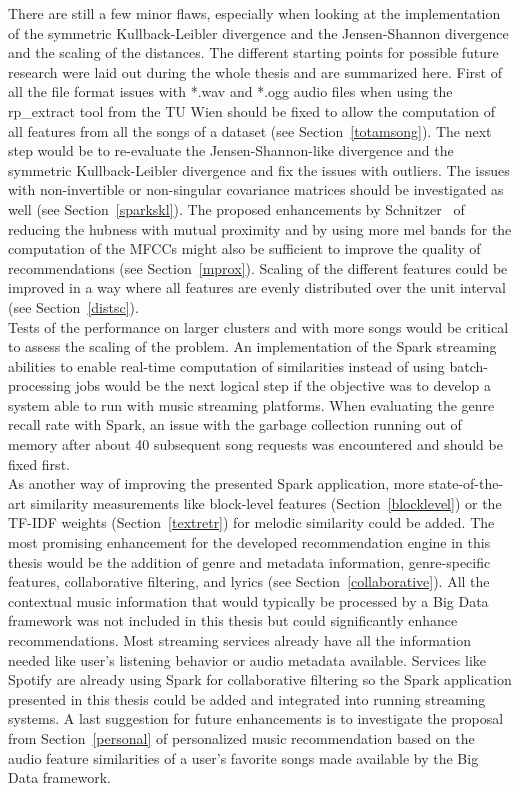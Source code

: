 There are still a few minor flaws, especially when looking at the implementation of the symmetric Kullback-Leibler divergence and the Jensen-Shannon divergence and the scaling of the distances. The different starting points for possible future research were laid out during the whole thesis and are summarized here. First of all the file format issues with *.wav and *.ogg audio files when using the rp\_extract tool from the TU Wien should be fixed to allow the computation of all features from all the songs of a dataset (see Section~\ref{totamsong}).
The next step would be to re-evaluate the Jensen-Shannon-like divergence and the symmetric Kullback-Leibler divergence and fix the issues with outliers. The issues with non-invertible or non-singular covariance matrices should be investigated as well (see Section~\ref{sparkskl}). The proposed enhancements by Schnitzer~\cite{schnitzer1} of reducing the hubness with mutual proximity and by using more mel bands for the computation of the MFCCs might also be sufficient to improve the quality of recommendations (see Section~\ref{mprox}). Scaling of the different features could be improved in a way where all features are evenly distributed over the unit interval (see Section~\ref{distsc}).\\
Tests of the performance on larger clusters and with more songs would be critical to assess the scaling of the problem.
An implementation of the Spark streaming abilities to enable real-time computation of similarities instead of using batch-processing jobs would be the next logical step if the objective was to develop a system able to run with music streaming platforms. When evaluating the genre recall rate with Spark, an issue with the garbage collection running out of memory after about 40 subsequent song requests was encountered and should be fixed first.\\
\noindent As another way of improving the presented Spark application, more state-of-the-art similarity measurements like block-level features (Section~\ref{blocklevel}) or the TF-IDF weights (Section~\ref{textretr}) for melodic similarity could be added. The most promising enhancement for the developed recommendation engine in this thesis would be the addition of genre and metadata information, genre-specific features, collaborative filtering, and lyrics (see Section~\ref{collaborative}). All the contextual music information that would typically be processed by a Big Data framework was not included in this thesis but could significantly enhance recommendations. Most streaming services already have all the information needed like user's listening behavior or audio metadata available. Services like Spotify are already using Spark for collaborative filtering so the Spark application presented in this thesis could be added and integrated into running streaming systems. A last suggestion for future enhancements is to investigate the proposal from Section~\ref{personal} of personalized music recommendation based on the audio feature similarities of a user's favorite songs made available by the Big Data framework.

